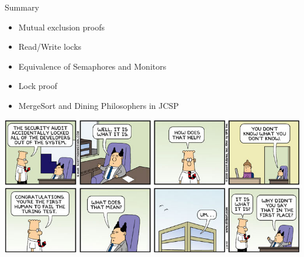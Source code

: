 \begin{frame}{Summary}
  \begin{itemize}
  \item Mutual exclusion proofs
  \item Read/Write locks
  \item Equivalence of Semaphores and Monitors
  \item Lock proof
  \item MergeSort and Dining Philosophers in JCSP
  \end{itemize}


  \begin{center}
    \includegraphics[scale=0.4]{figures/dilbert-turing-test}
  \end{center}
\end{frame}


